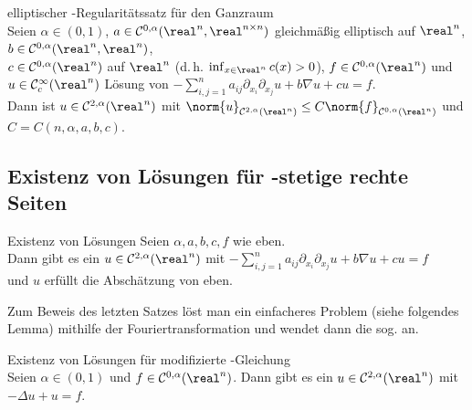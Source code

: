 \begin{Satz}{elliptischer -Regularitätssatz für den Ganzraum}\\
    Seien $\alpha \in (0, 1)$,
    $a \in \C^{0,\alpha}(\real^n, \real^{n \times n})$
    gleichmäßig elliptisch auf $\real^n$,
    $b \in \C^{0,\alpha}(\real^n, \real^n)$,\\
    $c \in \C^{0,\alpha}(\real^n)$  auf $\real^n$
    (d.\,h. $\inf_{x \in \real^n} c(x) > 0$),
    $f \in \C^{0,\alpha}(\real^n)$ und\\
    $u \in \C^\infty_c(\real^n)$ Lösung von
    $-\sum_{i,j=1}^n a_{ij} \partial_{x_i} \partial_{x_j} u + b \nabla u + cu = f$.\\
    Dann ist $u \in \C^{2,\alpha}(\real^n)$ mit
    $\norm{u}_{\C^{2,\alpha}(\real^n)} \le C \norm{f}_{\C^{0,\alpha}(\real^n)}$ und
    $C = C(n, \alpha, a, b, c)$.
\end{Satz}

\subsection{%
    Existenz von Lösungen für -stetige rechte Seiten%
}

\begin{Satz}{Existenz von Lösungen}
    Seien $\alpha, a, b, c, f$ wie eben.\\
    Dann gibt es ein $u \in \C^{2,\alpha}(\real^n)$ mit
    $-\sum_{i,j=1}^n a_{ij} \partial_{x_i} \partial_{x_j} u + b \nabla u + cu = f$\\
    und $u$ erfüllt die Abschätzung von eben.
\end{Satz}

\linie

\begin{Bem}
    Zum Beweis des letzten Satzes löst man ein einfacheres Problem (siehe folgendes Lemma)
    mithilfe der Fouriertransformation und wendet dann die sog.  an.
\end{Bem}

\begin{Lemma}{Existenz von Lösungen für modifizierte -Gleichung}\\
    Seien $\alpha \in (0, 1)$ und $f \in \C^{0,\alpha}(\real^n)$.
    Dann gibt es ein $u \in \C^{2,\alpha}(\real^n)$ mit
    $-\Delta u + u = f$.
\end{Lemma}

